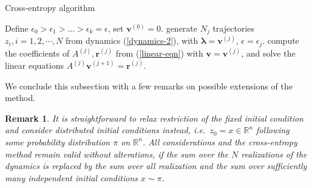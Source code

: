 \documentclass[final]{siamltex}
\newcommand{\R}{{\mathbb R}}
\newcommand{\eps}{\epsilon}
\newcommand{\blambda}{\bm{\lambda}}
\newtheorem{remark}{Remark}
\begin{document}
\begin{algorithm}
  \caption{Cross-entropy algorithm \label{ce-algo}}
  \begin{algorithmic}[1]
    \State Define $\eps_0 > \eps_{1} > \ldots > \eps_k = \eps$, set
    $\bm{v}^{(0)} = 0$.
    \State generate $N_j$ trajectories $z_i, i=1,2,\cdots, N$ from dynamics (\ref{dynamics-2}), with
    $\blambda = \bm{v}^{(j)}$, $\eps = \eps_j$.
    \State compute the coefficients of $A^{(j)}, \bm{r}^{(j)}$ from (\ref{linear-eqn}) with $\bm{v} =
    \bm{v}^{(j)}$, and solve the linear equations $A^{(j)}\bm{v}^{(j+1)} =
    \bm{r}^{(j)}$.
    \EndFor 
  \end{algorithmic}
  \label{algo1}
\end{algorithm}



We conclude this subsection with a few remarks on possible extensions of the method.
\begin{remark}
It is straightforward to relax restriction of the fixed initial condition and consider distributed initial conditions instead, i.e.~$z_{0}=x\in\R^{n}$ following some probability distribution $\pi$ on $\R^{n}$. All considerations and the cross-entropy method remain valid without alterations, if the sum over the $N$ realizations of the dynamics is replaced by the sum over all realization \emph{and} the sum over sufficiently many independent initial conditions $x\sim \pi$. 
\end{remark}
\end{document}
